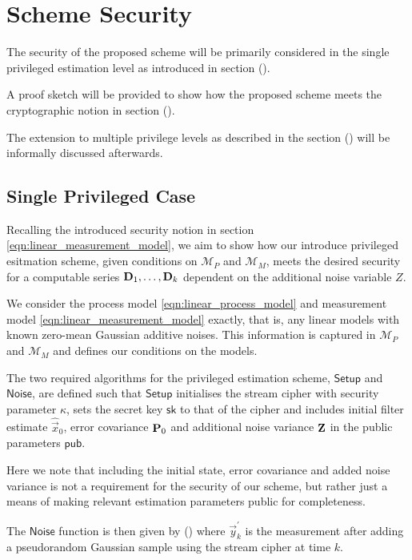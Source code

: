 \documentclass[conference]{IEEEtran}
\theoremstyle{definition}
\theoremstyle{definition}
\theoremstyle{remark}
\begin{document}
\section{Scheme Security}
The security of the proposed scheme will be primarily considered in the single privileged estimation level as introduced in section ().

A proof sketch will be provided to show how the proposed scheme meets the cryptographic notion in section ().

The extension to multiple privilege levels as described in the section () will be informally discussed afterwards.

\subsection{Single Privileged Case}
Recalling the introduced security notion in section \eqref{eqn:linear_measurement_model}, we aim to show how our introduce privileged esitmation scheme, given conditions on $\mathcal{M}_P$ and $\mathcal{M}_M$, meets the desired security for a computable series ${{\mathbf{D}}}_1,\dots,{{\mathbf{D}}}_k$ dependent on the additional noise variable $Z$.

We consider the process model \eqref{eqn:linear_process_model} and measurement model \eqref{eqn:linear_measurement_model} exactly, that is, any linear models with known zero-mean Gaussian additive noises. This information is captured in $\mathcal{M}_P$ and $\mathcal{M}_M$ and defines our conditions on the models.

The two required algorithms for the privileged estimation scheme, $\mathsf{Setup}$ and $\mathsf{Noise}$, are defined such that $\mathsf{Setup}$ initialises the stream cipher with security parameter $\kappa$, sets the secret key $\mathsf{sk}$ to that of the cipher and includes initial filter estimate $\hat{\vec{x}}_0$, error covariance ${{\mathbf{P}}}_0$ and additional noise variance ${{\mathbf{Z}}}$ in the public parameters $\mathsf{pub}$.

Here we note that including the initial state, error covariance and added noise variance is not a requirement for the security of our scheme, but rather just a means of making relevant estimation parameters public for completeness.

The $\mathsf{Noise}$ function is then given by () where $\vec{y}^\prime_k$ is the measurement after adding a pseudorandom Gaussian sample using the stream cipher at time $k$.
\end{document}
